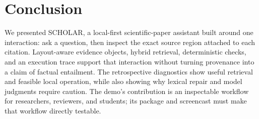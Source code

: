\section{Conclusion}
\label{sec:conclusion}

We presented \textsc{SCHOLAR}, a local-first scientific-paper assistant built around one interaction: ask a question, then inspect the exact source region attached to each citation. Layout-aware evidence objects, hybrid retrieval, deterministic checks, and an execution trace support that interaction without turning provenance into a claim of factual entailment. The retrospective diagnostics show useful retrieval and feasible local operation, while also showing why lexical repair and model judgments require caution. The demo's contribution is an inspectable workflow for researchers, reviewers, and students; its package and screencast must make that workflow directly testable.
